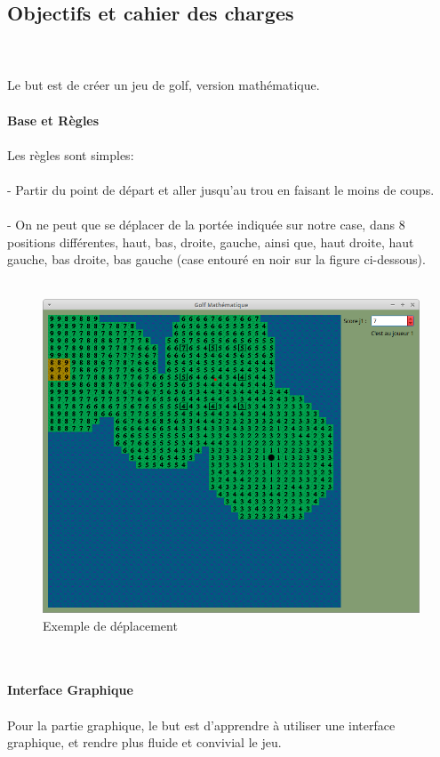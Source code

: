 \documentclass{article}
\begin{document}
\subsection{Objectifs et cahier des charges}
~\\~\\
Le but est de créer un jeu de golf, version mathématique.
\\~\\
\textbf{\large Base et Règles}
\\~\\
Les règles sont simples:
\\~\\
- Partir du point de départ et aller jusqu'au trou en faisant le moins de coups.
\\~\\
- On ne peut que se déplacer de la portée indiquée sur notre case, dans 8 positions différentes, haut, bas, droite, gauche, ainsi que, haut droite, haut gauche, bas droite, bas gauche (case entouré en noir sur la figure ci-dessous).
\\~\\
\begin{figure}[!h]
\centering
\includegraphics[scale=0.3]{Images/move.png}
\caption{Exemple de déplacement}
\end{figure}
\\~\\
\newpage
\textbf{\large Interface Graphique}
\\~\\
Pour la partie graphique, le but est d'apprendre à utiliser une interface graphique, et rendre plus fluide et convivial le jeu.
\end{document}
